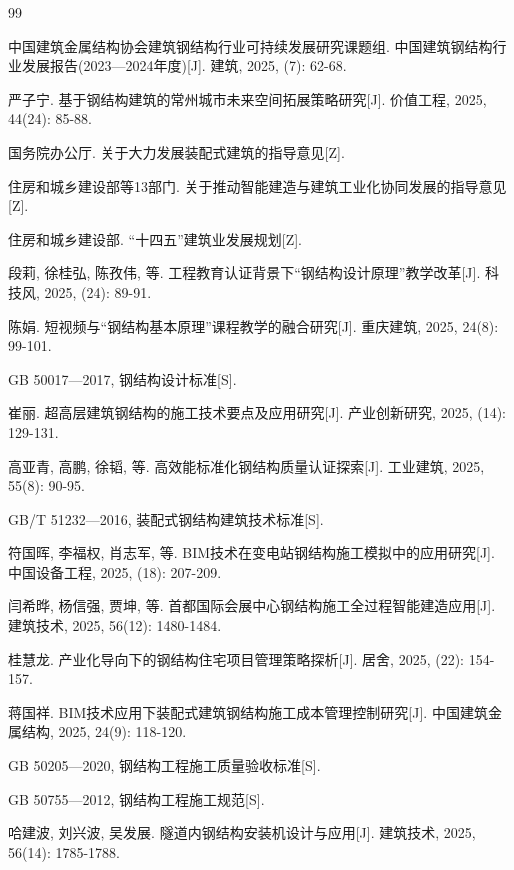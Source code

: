 \documentclass[UTF8,a4paper,10.5pt]{ctexart}
\begin{document}
\begin{thebibliography}{99}
\fontsize{9pt}{14pt}\selectfont\songti

中国建筑金属结构协会建筑钢结构行业可持续发展研究课题组. 中国建筑钢结构行业发展报告(2023—2024年度)[J]. 建筑, 2025, (7): 62-68.

严子宁. 基于钢结构建筑的常州城市未来空间拓展策略研究[J]. 价值工程, 2025, 44(24): 85-88.

国务院办公厅. 关于大力发展装配式建筑的指导意见[Z].

住房和城乡建设部等13部门. 关于推动智能建造与建筑工业化协同发展的指导意见[Z].

住房和城乡建设部. “十四五”建筑业发展规划[Z].

段莉, 徐桂弘, 陈孜伟, 等. 工程教育认证背景下“钢结构设计原理”教学改革[J]. 科技风, 2025, (24): 89-91.

陈娟. 短视频与“钢结构基本原理”课程教学的融合研究[J]. 重庆建筑, 2025, 24(8): 99-101.

GB 50017—2017, 钢结构设计标准[S].

崔丽. 超高层建筑钢结构的施工技术要点及应用研究[J]. 产业创新研究, 2025, (14): 129-131.

高亚青, 高鹏, 徐韬, 等. 高效能标准化钢结构质量认证探索[J]. 工业建筑, 2025, 55(8): 90-95.

GB/T 51232—2016, 装配式钢结构建筑技术标准[S].

符国晖, 李福权, 肖志军, 等. BIM技术在变电站钢结构施工模拟中的应用研究[J]. 中国设备工程, 2025, (18): 207-209.

闫希晔, 杨信强, 贾坤, 等. 首都国际会展中心钢结构施工全过程智能建造应用[J]. 建筑技术, 2025, 56(12): 1480-1484.

桂慧龙. 产业化导向下的钢结构住宅项目管理策略探析[J]. 居舍, 2025, (22): 154-157.

蒋国祥. BIM技术应用下装配式建筑钢结构施工成本管理控制研究[J]. 中国建筑金属结构, 2025, 24(9): 118-120.

GB 50205—2020, 钢结构工程施工质量验收标准[S].

GB 50755—2012, 钢结构工程施工规范[S].

哈建波, 刘兴波, 吴发展. 隧道内钢结构安装机设计与应用[J]. 建筑技术, 2025, 56(14): 1785-1788.


\end{thebibliography}
\end{document}
